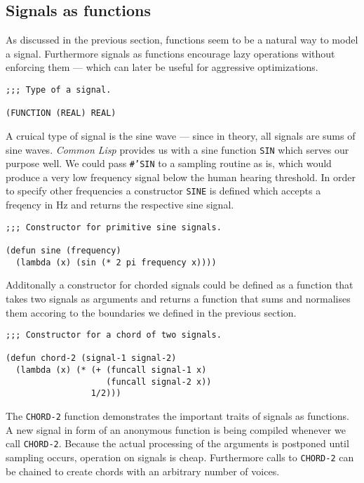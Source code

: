 \subsection{Signals as functions}

As discussed in the previous section, functions seem to be a natural way
to model a signal. Furthermore signals as functions encourage lazy
operations without enforcing them --- which can later be useful for
aggressive optimizations.

\begin{verbatim}
;;; Type of a signal.

(FUNCTION (REAL) REAL)
\end{verbatim}

A cruical type of signal is the sine wave --- since in theory, all
signals are sums of sine waves. \textit{Common Lisp} provides us with a
sine function \texttt{SIN} which serves our purpose well. We could pass
\texttt{\#'SIN} to a sampling routine as is, which would produce a very
low frequency signal below the human hearing threshold. In order to
specify other frequencies a constructor \texttt{SINE} is defined which
accepts a freqency in Hz and returns the respective sine signal.

\begin{verbatim}
;;; Constructor for primitive sine signals.

(defun sine (frequency)
  (lambda (x) (sin (* 2 pi frequency x))))
\end{verbatim}

Additonally a constructor for chorded signals could be defined as a
function that takes two signals as arguments and returns a function that
sums and normalises them accoring to the boundaries we defined in the
previous section.

\begin{verbatim}
;;; Constructor for a chord of two signals.

(defun chord-2 (signal-1 signal-2)
  (lambda (x) (* (+ (funcall signal-1 x)
                    (funcall signal-2 x))
                 1/2)))
\end{verbatim}

The \texttt{CHORD-2} function demonstrates the important traits of
signals as functions. A new signal in form of an anonymous function is
being compiled whenever we call \texttt{CHORD-2}. Because the actual
processing of the arguments is postponed until sampling occurs,
operation on signals is cheap. Furthermore calls to \texttt{CHORD-2}
can be chained to create chords with an arbitrary number of voices.
